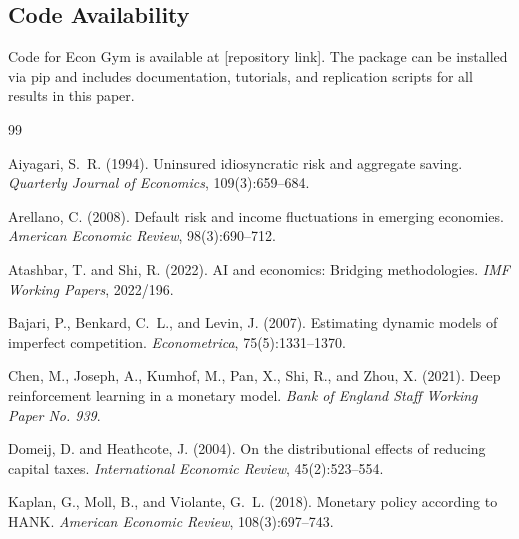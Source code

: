 \documentclass[12pt]{article}
\begin{document}
\subsection{Code Availability}

Code for Econ Gym is available at [repository link]. The package can be installed via pip and includes documentation, tutorials, and replication scripts for all results in this paper.


\newpage


\begin{thebibliography}{99}

Aiyagari, S.~R. (1994).
\newblock Uninsured idiosyncratic risk and aggregate saving.
\newblock \textit{Quarterly Journal of Economics}, 109(3):659--684.

Arellano, C. (2008).
\newblock Default risk and income fluctuations in emerging economies.
\newblock \textit{American Economic Review}, 98(3):690--712.

Atashbar, T. and Shi, R. (2022).
\newblock AI and economics: Bridging methodologies.
\newblock \textit{IMF Working Papers}, 2022/196.

Bajari, P., Benkard, C.~L., and Levin, J. (2007).
\newblock Estimating dynamic models of imperfect competition.
\newblock \textit{Econometrica}, 75(5):1331--1370.

Chen, M., Joseph, A., Kumhof, M., Pan, X., Shi, R., and Zhou, X. (2021).
\newblock Deep reinforcement learning in a monetary model.
\newblock \textit{Bank of England Staff Working Paper No. 939}.

Domeij, D. and Heathcote, J. (2004).
\newblock On the distributional effects of reducing capital taxes.
\newblock \textit{International Economic Review}, 45(2):523--554.

Kaplan, G., Moll, B., and Violante, G.~L. (2018).
\newblock Monetary policy according to HANK.
\newblock \textit{American Economic Review}, 108(3):697--743.


\end{thebibliography}
\end{document}
